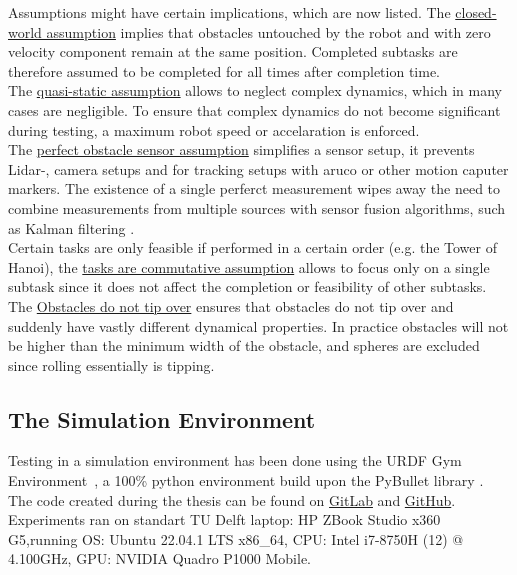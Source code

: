 Assumptions might have certain implications, which are now listed. The \hyperref[assumption:closed_world]{closed-world assumption} implies that obstacles untouched by the robot and with zero velocity component remain at the same position. Completed subtasks are therefore assumed to be completed for all times after completion time.\\The \hyperref[assumption:quasi_static]{quasi-static assumption} allows to neglect complex dynamics, which in many cases are negligible. To ensure that complex dynamics do not become significant during testing, a maximum robot speed or accelaration is enforced.\\The \hyperref[assumption:perfect_obstacle_sensor]{perfect obstacle sensor assumption} simplifies a sensor setup, it prevents Lidar-, camera setups and for tracking setups with aruco or other motion caputer markers. The existence of a single perferct measurement wipes away the need to combine measurements from multiple sources with sensor fusion algorithms, such as Kalman filtering \cite{verhaegen_filtering_2007}.\\Certain tasks are only feasible if performed in a certain order (e.g. the Tower of Hanoi), the \hyperref[assumption:order_does_not_matter]{tasks are commutative assumption} allows to focus only on a single subtask since it does not affect the completion or feasibility of other subtasks.\\The \hyperref[assumption:no_tipping]{Obstacles do not tip over} ensures that obstacles do not tip over and suddenly have vastly different dynamical properties. In practice obstacles will not be higher than the minimum width of the obstacle, and spheres are excluded since rolling essentially is tipping. 

\subsection{The Simulation Environment}
Testing in a simulation environment has been done using the URDF Gym Environment~\cite{spahn_urdfenvironment_2022}, a 100\% python environment build upon the PyBullet library \cite{coumans_pybullet_2016}. The code created during the thesis can be found on \href{https://gitlab.tudelft.nl/airlab-delft/msc_projects/msc_gijs_groote}{GitLab} and \href{https://github.com/GijsGroote/semantic-thinking-robot}{GitHub}. Experiments ran on standart TU Delft laptop: HP ZBook Studio x360 G5,running OS: Ubuntu 22.04.1 LTS x86\_64, CPU: Intel i7-8750H (12) @ 4.100GHz, GPU: NVIDIA Quadro P1000 Mobile.\bs

